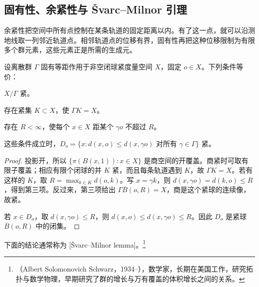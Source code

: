 \subsection{固有性、余紧性与 Švarc–Milnor 引理}
\label{g3:subsec:D01:04}

余紧性把空间中所有点控制在某条轨道的固定距离以内。有了这一点，就可以沿测地线取一列邻近轨道点。相邻轨道点的位移有界，固有性再把这种位移限制为有限多个群元素，这些元素正是所需的生成元。

\begin{proposition}\label{g3:prop:D-cocompact-orbit-net}
	设离散群 \(\Gamma\) 固有等距作用于非空闭球紧度量空间 \(X\)，固定 \(o\in X\)。下列条件等价：
	\begin{equivalences}
		\item \(X/\Gamma\) 紧。
		\item 存在紧集 \(K\subset X\)，使 \(\Gamma K=X\)。
		\item 存在 \(R<\infty\)，使每个 \(x\in X\) 距某个 \(\gamma o\) 不超过 \(R\)。
	\end{equivalences}
	这些条件成立时，\(D_o=\{x:d(x,o)\le d(x,\gamma o)\text{ 对所有 }\gamma\in\Gamma\}\) 紧。
\end{proposition}
\begin{proof}
	投影开，所以 \(\{\pi(B(x,1)):x\in X\}\) 是商空间的开覆盖。商紧时可取有限子覆盖；相应有限个闭球的并 \(K\) 紧，而且每条轨道遇到 \(K\)，故 \(\Gamma K=X\)。若有这样的 \(K\)，取 \(R=\max_{k\in K}d(o,k)\)。写 \(x=\gamma k\)，则 \(d(x,\gamma o)=d(k,o)\le R\)，得到第三项。反过来，第三项给出 \(\Gamma\overline B(o,R)=X\)，商是这个紧球的连续像，故紧。

	若 \(x\in D_o\)，取 \(d(x,\gamma o)\le R\)，则 \(d(x,o)\le d(x,\gamma o)\le R\)。因此 \(D_o\) 是紧球 \(\overline B(o,R)\) 中的闭集。
\end{proof}

下面的结论通常称为 [Švarc--Milnor lemma]。\footnote{（Albert Solomonovich Schwarz，1934--），数学家，长期在美国工作，研究拓扑与数学物理，早期研究了群的增长与万有覆盖的体积增长之间的关系。}

